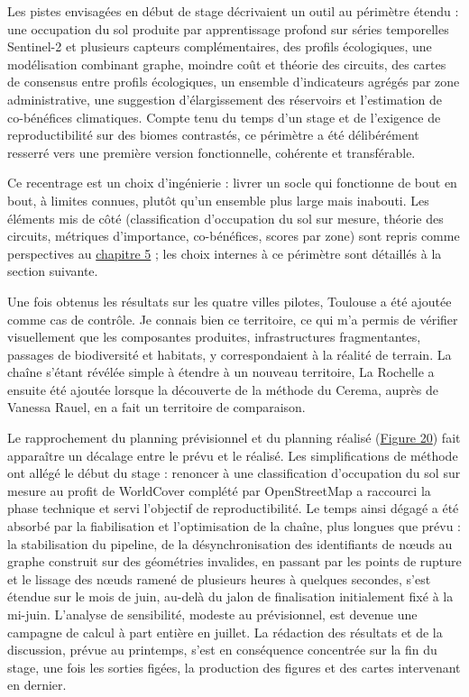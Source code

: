 \documentclass[a4paper,11pt]{report}
\begin{document}
Les pistes envisagées en début de stage décrivaient un outil au périmètre étendu : une occupation du sol produite par apprentissage profond sur séries temporelles Sentinel-2 et plusieurs capteurs complémentaires, des profils écologiques, une modélisation combinant graphe, moindre coût et théorie des circuits, des cartes de consensus entre profils écologiques, un ensemble d'indicateurs agrégés par zone administrative, une suggestion d'élargissement des réservoirs et l'estimation de co-bénéfices climatiques. Compte tenu du temps d'un stage et de l'exigence de reproductibilité sur des biomes contrastés, ce périmètre a été délibérément resserré vers une première version fonctionnelle, cohérente et transférable.

Ce recentrage est un choix d'ingénierie : livrer un socle qui fonctionne de bout en bout, à limites connues, plutôt qu'un ensemble plus large mais inabouti. Les éléments mis de côté (classification d'occupation du sol sur mesure, théorie des circuits, métriques d'importance, co-bénéfices, scores par zone) sont repris comme perspectives au \hyperref[chap:5]{chapitre 5} ; les choix internes à ce périmètre sont détaillés à la section suivante.

Une fois obtenus les résultats sur les quatre villes pilotes, Toulouse a été ajoutée comme cas de contrôle. Je connais bien ce territoire, ce qui m'a permis de vérifier visuellement que les composantes produites, infrastructures fragmentantes, passages de biodiversité et habitats, y correspondaient à la réalité de terrain. La chaîne s'étant révélée simple à étendre à un nouveau territoire, La Rochelle a ensuite été ajoutée lorsque la découverte de la méthode du Cerema, auprès de Vanessa Rauel, en a fait un territoire de comparaison.

Le rapprochement du planning prévisionnel et du planning réalisé (\hyperref[fig:20]{Figure 20}) fait apparaître un décalage entre le prévu et le réalisé. Les simplifications de méthode ont allégé le début du stage : renoncer à une classification d'occupation du sol sur mesure au profit de WorldCover complété par OpenStreetMap a raccourci la phase technique et servi l'objectif de reproductibilité. Le temps ainsi dégagé a été absorbé par la fiabilisation et l'optimisation de la chaîne, plus longues que prévu : la stabilisation du pipeline, de la désynchronisation des identifiants de n\oe{}uds au graphe construit sur des géométries invalides, en passant par les points de rupture et le lissage des n\oe{}uds ramené de plusieurs heures à quelques secondes, s'est étendue sur le mois de juin, au-delà du jalon de finalisation initialement fixé à la mi-juin. L'analyse de sensibilité, modeste au prévisionnel, est devenue une campagne de calcul à part entière en juillet. La rédaction des résultats et de la discussion, prévue au printemps, s'est en conséquence concentrée sur la fin du stage, une fois les sorties figées, la production des figures et des cartes intervenant en dernier.
\end{document}
